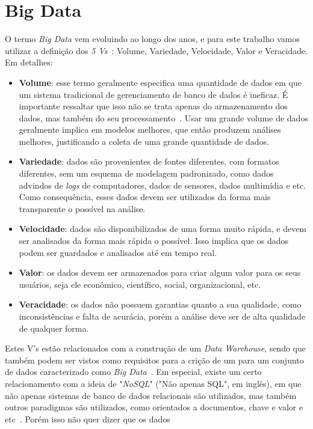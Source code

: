 \section{Big Data}
\label{ch:fun:bigdata}

O termo \textit{Big Data} vem evoluindo ao longo dos anos, e para este trabalho vamos utilizar a definição dos \textit{5 Vs}~\cite{bimonteOpenIssuesBig2016}: Volume, Variedade, Velocidade, Valor e Veracidade. Em detalhes:

\begin{itemize}
	\item \textbf{Volume}: esse termo geralmente especifica uma quantidade de dados em que um sistema tradicional de gerenciamento de banco de dados é ineficaz.
É importante ressaltar que isso não se trata apenas do armazenamento dos dados, mas também do seu processamento~\cite{boussoufBigDataBased2018}.
Usar um grande volume de dados geralmente implica em modelos melhores, que então produzem análises melhores, justificando a coleta de uma grande quantidade de dados.
	\item \textbf{Variedade}: dados são provenientes de fontes diferentes, com formatos diferentes, sem um esquema de modelagem padronizado, como dados advindos de \textit{logs} de computadores, dados de sensores, dados multimídia e etc.
Como consequência, esses dados devem ser utilizados da forma mais transparente o possível na análise.
	\item \textbf{Velocidade}: dados são disponibilizados de uma forma muito rápida, e devem ser analisados da forma mais rápida o possível.
Isso implica que os dados podem ser guardados e analisados até em tempo real.
	\item \textbf{Valor}: os dados devem ser armazenados para criar algum valor para os seus usuários, seja ele econômico, científico, social, organizacional, etc.
	\item \textbf{Veracidade}: os dados não possuem garantias quanto a sua qualidade, como inconsistências e falta de acurácia, porém a análise deve ser de alta qualidade de qualquer forma.
\end{itemize}

Estes V's estão relacionados com a construção de um \textit{Data Warehouse}, sendo que também podem ser vistos como requisitos para a crição de um para um conjunto de dados caracterizado como \textit{Big Data}~\cite{zhangBigDataFramework2017}.
Em especial, existe um certo relacionamento com a ideia de "\textit{NoSQL}" ("Não apenas SQL", em inglês), em que não apenas sistemas de banco de dados relacionais são utilizados, mas também outros paradigmas são utilizados, como orientados a documentos, chave e valor e etc~\cite{bimonteOpenIssuesBig2016}.
Porém isso não quer dizer que os dados 


